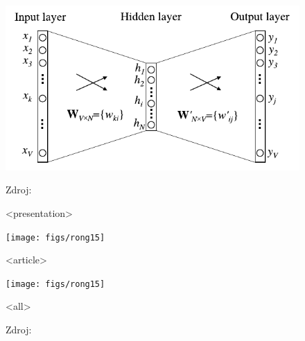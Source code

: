 
\begin{frame}
\begin{figure}[H]
\begin{center}
\includegraphics[width=0.5\paperwidth]{figs/rong14_fig1}
\bigskip\par
Zdroj: \textcite[obrázek 1]{rong14}
\end{center}
\end{figure}
\end{frame}


\begin{frame}
\begin{figure}[H]
\begin{center}

\mode
<presentation>

\texttt{[image: figs/rong15]}

\mode
<article>

\texttt{[image: figs/rong15]}

\mode
<all>

\bigskip\par
Zdroj: \textcite[strana 34]{rong15a}
\end{center}
\end{figure}
\end{frame}


